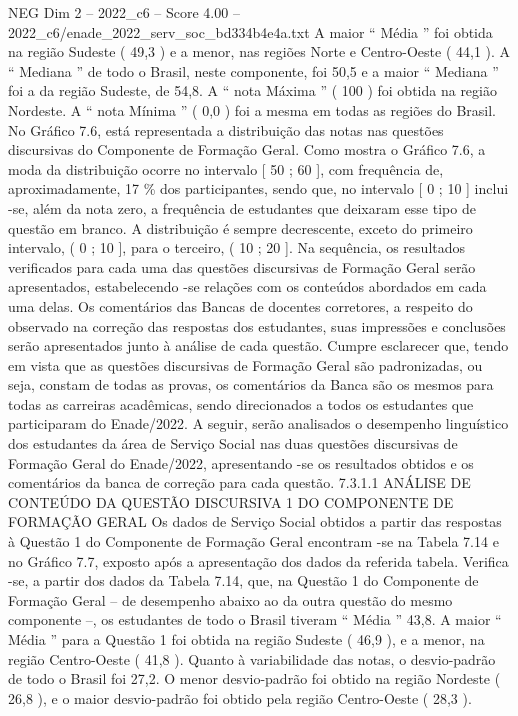 \begin{textsample}{NEG Dim 2 – 2022\_c6 – Score 4.00 – 2022\_c6/enade\_2022\_serv\_soc\_bd334b4e4a.txt}
A maior “ Média ” foi obtida na região Sudeste ( 49,3 ) e a menor, nas regiões Norte e Centro-Oeste ( 44,1 ).
A “ Mediana ” de todo o Brasil, neste componente, foi 50,5 e a maior “ Mediana ” foi a da região Sudeste, de 54,8.
A “ nota Máxima ” ( 100 ) foi obtida na região Nordeste.
A “ nota Mínima ” ( 0,0 ) foi a mesma em todas as regiões do Brasil.
No Gráfico 7.6, está representada a distribuição das notas nas questões discursivas do Componente de Formação Geral.
Como mostra o Gráfico 7.6, a moda da distribuição ocorre no intervalo [ 50 ; 60 ], com frequência de, aproximadamente, 17 \% dos participantes, sendo que, no intervalo [ 0 ; 10 ] inclui -se, além da nota zero, a frequência de estudantes que deixaram esse tipo de questão em branco.
A distribuição é sempre decrescente, exceto do primeiro intervalo, ( 0 ; 10 ], para o terceiro, ( 10 ; 20 ].
Na sequência, os resultados verificados para cada uma das questões discursivas de Formação Geral serão apresentados, estabelecendo -se relações com os conteúdos abordados em cada uma delas.
Os comentários das Bancas de docentes corretores, a respeito do observado na correção das respostas dos estudantes, suas impressões e conclusões serão apresentados junto à análise de cada questão.
Cumpre esclarecer que, tendo em vista que as questões discursivas de Formação Geral são padronizadas, ou seja, constam de todas as provas, os comentários da Banca são os mesmos para todas as carreiras acadêmicas, sendo direcionados a todos os estudantes que participaram do Enade/2022.
A seguir, serão analisados o desempenho linguístico dos estudantes da área de Serviço Social nas duas questões discursivas de Formação Geral do Enade/2022, apresentando -se os resultados obtidos e os comentários da banca de correção para cada questão. 7.3.1.1 ANÁLISE DE CONTEÚDO DA QUESTÃO DISCURSIVA 1 DO COMPONENTE DE FORMAÇÃO GERAL Os dados de Serviço Social obtidos a partir das respostas à Questão 1 do Componente de Formação Geral encontram -se na Tabela 7.14 e no Gráfico 7.7, exposto após a apresentação dos dados da referida tabela.
Verifica -se, a partir dos dados da Tabela 7.14, que, na Questão 1 do Componente de Formação Geral – de desempenho abaixo ao da outra questão do mesmo componente –, os estudantes de todo o Brasil tiveram “ Média ” 43,8.
A maior “ Média ” para a Questão 1 foi obtida na região Sudeste ( 46,9 ), e a menor, na região Centro-Oeste ( 41,8 ).
Quanto à variabilidade das notas, o desvio-padrão de todo o Brasil foi 27,2.
O menor desvio-padrão foi obtido na região Nordeste ( 26,8 ), e o maior desvio-padrão foi obtido pela região Centro-Oeste ( 28,3 ).

\end{textsample}
